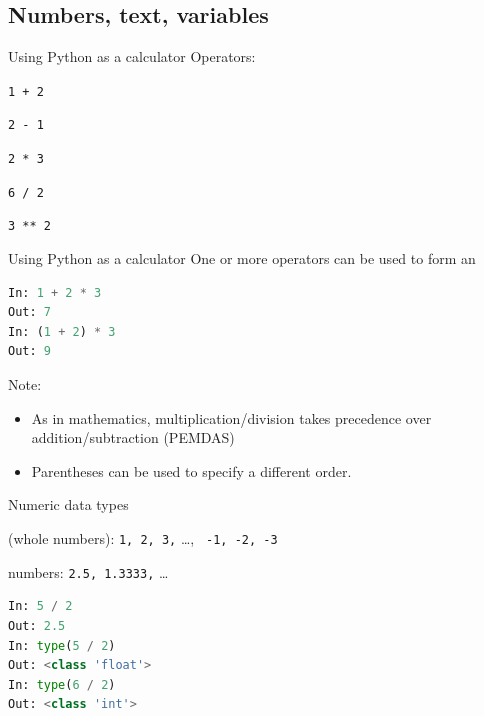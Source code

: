 \documentclass[aspectratio=169,usenames,dvipsnames]{beamer}
\begin{document}
\subsection{Numbers, text, variables}
\frame{\tableofcontents[currentsubsection]}

\begin{frame}[fragile]{Using Python as a calculator}
Operators:
    \begin{description}[Exponentation]
        \item[Addition] \lstinline{1 + 2}
        \item[Subtraction] \lstinline{2 - 1}
        \item[Multiplication] \lstinline{2 * 3}
        \item[Division] \lstinline{6 / 2}
        \item[Exponentation] \lstinline{3 ** 2}
    \end{description}
\end{frame}

\begin{frame}[fragile]{Using Python as a calculator}
One or more operators can be used to form an 
\begin{lstlisting}[language=python]
In: 1 + 2 * 3
Out: 7
In: (1 + 2) * 3
Out: 9
\end{lstlisting}

\pause
Note:
    \begin{itemize}
        \item As in mathematics, multiplication/division takes precedence over
            addition/subtraction (PEMDAS)
        \item Parentheses can be used to specify a different order.
    \end{itemize}
\end{frame}

\begin{frame}[fragile]{Numeric data types}
    \begin{description}
        \item[Integers] (whole numbers): \lstinline{1, 2, 3,} \dots, \lstinline{ -1, -2, -3}
        \item[Floating point] numbers: \lstinline{2.5, 1.3333,} \dots
    \end{description}

\pause
\begin{lstlisting}[language=python]
In: 5 / 2
Out: 2.5
In: type(5 / 2)
Out: <class 'float'>
In: type(6 / 2)
Out: <class 'int'>
\end{lstlisting}
\end{frame}
\end{document}
